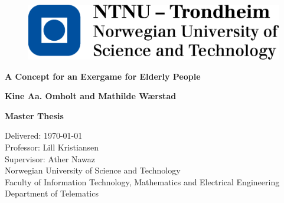 \documentclass[b5paper,twoside,openright,11pt]{report}
\begin{document}
\begin{flushleft}
\begin{figure}[htb]
\includegraphics[scale=0.6]{NTNU-logo}
\end{figure}
\bigskip
\bigskip
\bigskip
\bigskip
\begin{huge}
\textbf{A Concept for an Exergame for Elderly People}\\
\end{huge} 
\bigskip
\bigskip
\bigskip
\bigskip
\bigskip
\bigskip
\bigskip
\begin{Large}
\textbf{Kine Aa. Omholt and Mathilde Wærstad \\}
\end{Large}
\bigskip
\bigskip
\bigskip
\bigskip
\bigskip
\bigskip
\begin{large}
\textbf{Master Thesis\\}
\end{large}
Delivered: \today\\
Professor: Lill Kristiansen\\
Supervisor: Ather Nawaz\\
\bigskip
\bigskip
\bigskip
\bigskip
\bigskip
Norwegian University of Science and Technology\\ 
Faculty of Information Technology, Mathematics and Electrical Engineering\\
Department of Telematics
\end{flushleft}
\cleardoublepage
\end{document}
